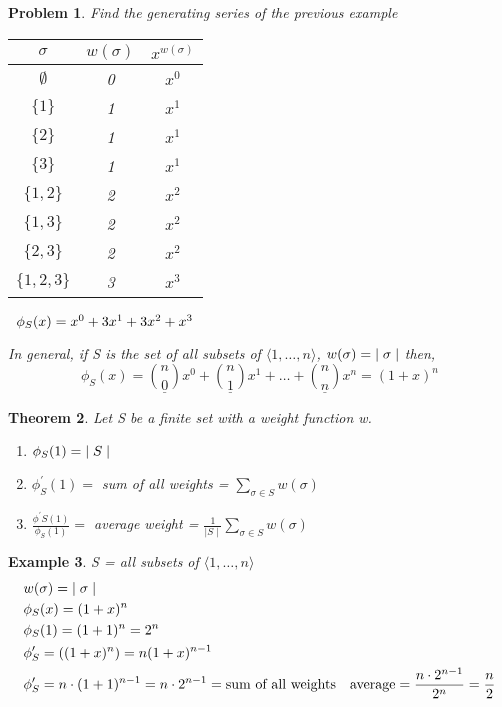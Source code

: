 \documentclass{article}
\newcounter{lecnum}
\newtheorem{theorem}{Theorem}[lecnum]
\newtheorem{ex}[theorem]{Example}
\newtheorem{expx}[theorem]{Problem}
\begin{document}
\begin{expx} Find the generating series of the previous example \\
\begin{center}
\begin{tabular}{|c|c|c|}
\hline 
\(\sigma\) & \(w(\sigma)\) & \(x^{w(\sigma)}\) \\ 
\hline 
$\emptyset$ & 0 & $x^0$ \\ 
\hline 
$ \{1\}$ & 1 & $x^1$ \\ 
\hline 
$ \{2\}$  & 1 & $x^1$ \\ 
\hline 
$ \{3\}$  & 1 & $x^1$ \\ 
\hline 
$ \{1, 2\}$  & 2 & $x^2$ \\ 
\hline 
$ \{1, 3\}$  & 2 & $x^2$ \\ 
\hline 
$ \{2, 3\}$  & 2 & $x^2$ \\ 
\hline 
$ \{1, 2, 3\}$  & 3 & $x^3$ \\ 
\hline 
\end{tabular} 
\(\hspace{0.2cm}\phi_S(x) = x^0 + 3x^1 + 3x^2 + x^3\)
\end{center}

In general, if S is the set of all subsets of \(\langle 1, \ldots, n \rangle\), \(w(\sigma) = \hspace{0.1cm} \mid \sigma \mid\) then,
\[\phi_S(x) = \underline{{n \choose 0}} x^0 + \underline{{n \choose 1}} x^1 + \ldots + \underline{{n \choose n}} x^n = (1 + x)^n\]
\end{expx}

\begin{theorem}
Let S be a finite set with a weight function w. 
\begin{enumerate}
\item[(a)] \(\phi_S(1) = \hspace{0.1cm}\mid S \mid\)
\item[(b)] \(\phi^{\prime}_S(1) = \) sum of all weights = \(\sum_{\sigma \in S} w(\sigma)\)
\item[(c)] \(\frac{\phi^{\prime}S(1)}{\phi_S(1)} =\) average weight = \( \frac{1}{\mid S \mid} \sum_{\sigma \in S} w (\sigma) \)
\end{enumerate}
\end{theorem}

\begin{ex} S = all subsets  of \(\langle 1, \ldots, n \rangle\) \\
\[ \begin{aligned}
& w(\sigma) = \hspace{0.1cm} \mid \sigma \mid \\
& \phi_S(x) = (1 + x)^n \\
& \phi_S(1) = (1 + 1)^n = 2^n \\
& \phi^{\prime}_S = ((1 + x)^n) = n ( 1 + x) ^{n -1} \\
& \phi^{\prime}_S = n \cdot (1 + 1)^{n - 1} = n \cdot 2^{n - 1} = \text{sum of all weights}
& \text{average} = \frac{n \cdot 2^{n -1}}{2^n} = \frac{n}{2}
\end{aligned}\]
\end{ex}
\end{document}
